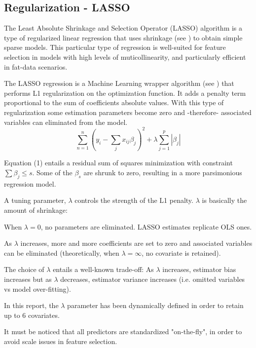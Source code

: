 \documentclass{article}
\begin{document}
\subsection{Regularization - LASSO}
The Least Absolute Shrinkage and Selection Operator (LASSO) algorithm is a type of regularized linear regression that uses shrinkage (see \cite{tibshirani1996}) to obtain simple sparse models. This particular type of regression is well-suited for feature selection in models with high levels of muticollinearity, and particularly efficient in fat-data scenarios.

The LASSO regression is a Machine Learning wrapper algorithm (see \cite{chandrashekar2014}) that performs L1 regularization on the optimization function. It adds a penalty term proportional to the sum of coefficients absolute values. With this type of regularization some estimation parameters become zero and -therefore- associated variables can eliminated from the model.
\begin{equation}
    \sum_{n=1}^{n}(y_i - \sum_{j}x_{ij}\beta_{j})^2 + \lambda \sum_{j=1}^p|\beta_{j}|
\end{equation}

Equation (1) entails a residual sum of squares minimization with constraint $\sum \beta_{j}\leq s$. Some of the $\beta_s$ are shrunk to zero, resulting in a more parsimonious regression model.

A tuning parameter, $\lambda$ controls the strength of the L1 penalty. $\lambda$ is basically the amount of shrinkage:

When $ \lambda = 0$, no parameters are eliminated. LASSO estimates replicate OLS ones.

As $\lambda$ increases, more and more coefficients are set to zero and associated variables can be eliminated (theoretically, when $\lambda = \infty$, no covariate is retained).

The choice of $\lambda$ entails a well-known trade-off:  As $\lambda$ increases, estimator bias increases but as $\lambda$ decreases, estimator variance increases (i.e. omitted variables vs model over-fitting).

In this report, the $\lambda$ parameter has been dynamically defined in order to retain up to 6 covariates.

It must be noticed that all predictors are standardized "on-the-fly", in order to avoid scale issues in feature selection.
\end{document}
